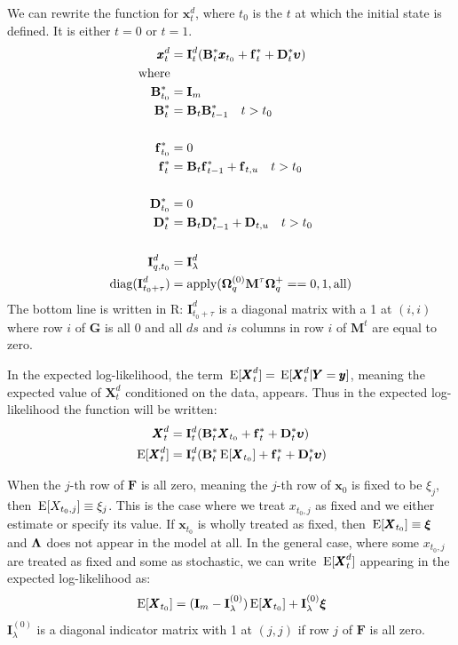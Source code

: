 \documentclass[]{article}
\def\uupsilon{\pmb{\upsilon}}
\def\xixi{\mbox{\boldmath $\xi$}}
\def\LAM{\mbox{\boldmath $\Lambda$}}
\def\OMG{\mbox{\boldmath $\Omega$}}
\def\BB{\mbox{$\mathbf B$}}	\def\bb{\mbox{$\mathbf b$}}
\def\DD{\mbox{$\mathbf D$}}	\def\dd{\mbox{$\mathbf d$}}
\def\FF{\mbox{$\mathbf F$}} \def\ff{\mbox{$\mathbf f$}}
\def\GG{\mbox{$\mathbf G$}}	\def\gg{\mbox{$\mathbf g$}}
\def\II{\mbox{$\mathbf I$}} \def\ii{\mbox{$\mathbf i$}}
\def\MM{\mbox{$\mathbf M$}}  \def\mm{\mbox{$\mathbf m$}}
\def\XX{\mbox{$\pmb{X}$}}	\def\xx{\mbox{$\pmb{x}$}}
\def\YY{\mbox{$\pmb{Y}$}}	\def\yy{\mbox{$\pmb{y}$}}
\def\E{\,\textup{\textrm{E}}}
\begin{document}
We can rewrite the function for $\xx_t^d$, where $t_0$ is the $t$ at which the initial state is defined.  It is either $t=0$ or $t=1$.
\begin{equation} \label{eq:xt.det.sum2}
\begin{split}
\xx_t^d &= \II_t^d(\BB^*_t\xx_{t_0} + \ff^*_t +\DD^*_t\uupsilon) \\
\text{where}&\\
\BB^*_{t_0} &= \II_m \\
\BB^*_{t} &=\BB_t\BB^*_{t-1}\quad t > t_0 \\ 
\\
\ff^*_{t_0} &= 0 \\
\ff^*_t &=\BB_t\ff^*_{t-1} + \ff_{t,u}\quad t > t_0\\ 
\\
\DD^*_{t_0} &= 0 \\
\DD^*_t &= \BB_t\DD^*_{t-1}  + \DD_{t,u}\quad t > t_0\\ 
\\
\II_{q,t_0}^d&=\II_\lambda^d\\
\text{diag}(\II_{t_0+\tau}^d)&=\text{apply}(\OMG_q^{(0)}\MM^\tau\OMG_q^+ == 0, 1, \text{all}) 
\end{split}
\end{equation}
The bottom line is written in R: $\II_{t_0+\tau}^d$ is a diagonal matrix with a 1 at $(i,i)$ where row $i$ of $\GG$ is all 0 and all $ds$ and $is$ columns in row $i$ of $\MM^t$ are equal to zero.

In the expected log-likelihood, the term $\E[\XX_t^d]=\E[\XX_t^d|\YY=\yy]$, meaning the expected value of $\XX_t^d$ conditioned on the data, appears. Thus in the expected log-likelihood the function will be written:
\begin{equation}
\begin{split}
\XX_t^d &= \II_t^d(\BB^*_t\XX_{t_0} + \ff^*_t +\DD^*_t\uupsilon) \\
\E[\XX_t^d] &= \II_t^d(\BB^*_t\E[\XX_{t_0}] + \ff^*_t +\DD^*_t\uupsilon)
\end{split}
\end{equation}

When the $j$-th row of $\FF$ is all zero, meaning the $j$-th row of $\xx_0$ is fixed to be $\xi_j$, then $\E[X_{t_0,j}]\equiv\xi_j$.  This is the case where we treat $x_{t_0,j}$ as fixed and we either estimate or specify its value.  If $\xx_{t_0}$ is wholly treated as fixed, then $\E[\XX_{t_0}]\equiv\xixi$ and $\LAM$ does not appear in the model at all.  In the general case, where some $x_{t_0,j}$ are treated as fixed and some as stochastic, we can write $\E[\XX_t^d]$ appearing in the expected log-likelihood as:
\begin{equation}\label{eq:EXtd}
\begin{split}
\E[\XX_{t_0}]=(\II_m-\II_\lambda^{(0)})\E[\XX_{t_0}]+\II_\lambda^{(0)}\xixi
\end{split}
\end{equation}
$\II_\lambda^{(0)}$ is a diagonal indicator matrix with 1 at $(j,j)$ if row $j$ of $\FF$ is all zero.
  
\end{document}
